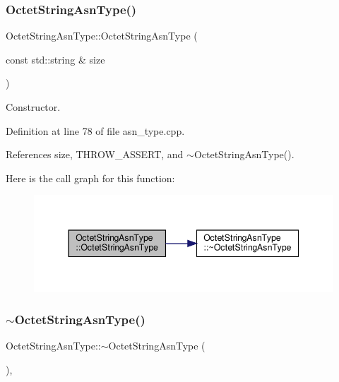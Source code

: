 \subsubsection{\texorpdfstring{Octet\+String\+Asn\+Type()}{OctetStringAsnType()}}
{\footnotesize\ttfamily Octet\+String\+Asn\+Type\+::\+Octet\+String\+Asn\+Type (\begin{DoxyParamCaption}\item[{const std\+::string \&}]{size }\end{DoxyParamCaption})\hspace{0.3cm}{\ttfamily [explicit]}}



Constructor. 



Definition at line 78 of file asn\+\_\+type.\+cpp.



References size, T\+H\+R\+O\+W\+\_\+\+A\+S\+S\+E\+RT, and $\sim$\+Octet\+String\+Asn\+Type().

Here is the call graph for this function\+:
\nopagebreak
\begin{figure}[H]
\begin{center}
\leavevmode
\includegraphics[width=344pt]{d2/d9f/classOctetStringAsnType_ab3f5b12f082342c386db27fdc30f9325_cgraph}
\end{center}
\end{figure}
\mbox{\label{classOctetStringAsnType_a48c66e843c1be6a0ad03e4d558e4381d}} 
\subsubsection{\texorpdfstring{$\sim$\+Octet\+String\+Asn\+Type()}{~OctetStringAsnType()}}
{\footnotesize\ttfamily Octet\+String\+Asn\+Type\+::$\sim$\+Octet\+String\+Asn\+Type (\begin{DoxyParamCaption}{ }\end{DoxyParamCaption})\hspace{0.3cm}{\ttfamily [override]}, {\ttfamily [default]}}



